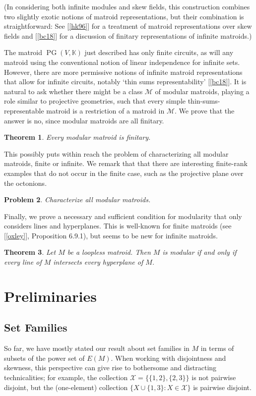 \documentclass{amsart}
\theoremstyle{plain}
\newtheorem{theorem}{Theorem}[section]
\newtheorem{problem}[theorem]{Problem}
\theoremstyle{definition}
\newcommand{\bK}{\mathbb K}
\newcommand{\cM}{\mathcal{M}}
\newcommand{\cX}{\mathcal{X}}
\DeclareMathOperator{\PG}{PG}
\begin{document}
(In considering both infinite modules and skew fields, 
this construction combines two slightly exotic notions of matroid representations, 
but their combination is straightforward: 
See [\ref{hk96}] for a treatment of matroid representations over skew fields 
and [\ref{bc18}] for a discussion of finitary representations of infinite matroids.)

The matroid $\PG(V,\bK)$ just described has only finite circuits, 
as will any matroid using the conventional notion of linear independence for infinite sets. 
However, there are more permissive notions of infinite matroid representations 
that allow for infinite circuits, notably `thin sums representability' [\ref{bc18}].
It is natural to ask whether there might be a class $\cM$ of modular matroids, 
playing a role similar to projective geometries, such that 
every simple thin-sums-representable matroid is a restriction of a matroid in $\cM$. 
We prove that the answer is no, since modular matroids are all finitary. 

\begin{theorem}\label{modularfinitary}
Every modular matroid is finitary. 
\end{theorem}

This possibly puts within reach the problem of characterizing all modular matroids, finite or infinite. 
We remark that that there are interesting finite-rank examples that do not occur
in the finite case, such as the projective plane over the octonions. 

\begin{problem}
  Characterize all modular matroids. 
\end{problem}

Finally, we prove a necessary and sufficient condition for modularity
that only considers lines and hyperplanes. This is well-known for finite matroids
(see [\ref{oxley}], Proposition 6.9.1), but seems to be new for infinite 
matroids.

\begin{theorem}\label{modularlinehyperplane}
  Let $M$ be a loopless matroid. Then $M$ is modular if and only if every line of $M$
  intersects every hyperplane of $M$. 
\end{theorem}

\section{Preliminaries}

\subsection*{Set Families}
So far, we have mostly stated our result about set families in $M$ in terms of 
subsets of the power set of $E(M)$. 
When working with disjointness and skewness, 
this perspective can give rise to bothersome and distracting technicalities; 
for example, the collection $\cX = \{\{1,2\},\{2,3\}\}$ is not pairwise disjoint,
but the (one-element) collection $\{X \cup \{1,3\} : X \in \cX\}$ is pairwise disjoint. 
\end{document}
